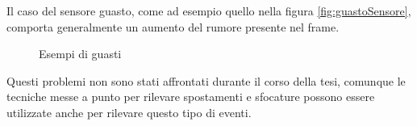 Il caso del sensore guasto, come ad esempio quello nella figura \ref{fig:guastoSensore}, comporta generalmente un aumento del rumore presente nel frame. \\
\begin{figure}
	\centering
	\caption{Esempi di guasti}
	\label{fig:guasti}
\end{figure}
Questi problemi non sono stati affrontati durante il corso della tesi, comunque le tecniche messe a punto per rilevare spostamenti e sfocature possono essere utilizzate anche per rilevare questo tipo di eventi. 
